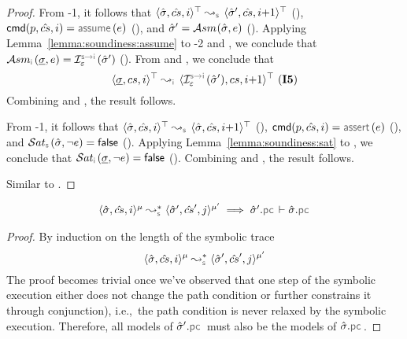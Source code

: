 \begin{proof}
\noindent {}
From \hyp{1}, it follows that $\abssemrule{\sstate, \scs, i}{\sstate', \scs, i{+}1}{\top}{\top}{\symbolic}$ (), 
$\ccmd[\prog][\scs]{i}  = \assume(\jsilexpr)$ (), and $\hat{\sigma}' = \mathcal{A}{sm}_{}(\hat{\sigma}, e)$ (). 
Applying Lemma~\ref{lemma:soundiness:assume} to 
\hyp{2} and , we conclude that 
$\absassume{\instrumented}(\istate, \jsilexpr) = \interpret{\symbinst}{\senv}(\sstate')$ (). 
From  and , we conclude that 
 $$\abssemrule{\istate, \cs, i}{\interpret{\symbinst}{\senv}(\sstate'), \cs, i{+}1}{\top}{\top}{\instrumented} \text{ (\ieq{5})}$$
 Combining   and , the result follows.
 \vspace{5pt}

\noindent {}
From \hyp{1}, it follows that $\abssemrule{\sstate, \scs, i}{\sstate, \scs, i{+}1}{\top}{\top}{\symbolic}$ (), 
$ \ccmd[\prog][\scs]{i}  = \jassert(\jsilexpr)$ (), and {$\abssat{\symbolic}(\sstate, \neg \jsilexpr) = \jfalse$} (). 
Applying Lemma~\ref{lemma:soundiness:sat} to , we conclude that 
$\abssat{\instrumented}(\istate, \neg \jsilexpr) = \jfalse$ (). 
Combining  and , the result follows. 
 \vspace{5pt}
 
\noindent {}
Similar to . 
 \vspace{5pt} 
\end{proof}


\begin{lemma}\label{lemma:pc:monotonocity}
$$
\begin{array}{l}
\transabssemrule{\sstate, \scs, i}{\sstate', \scs', j}{\mode}{\mode'}{\symbolic} 
    \implies \sstate'.\pcsel \vdash \sstate.\pcsel
\end{array}
$$
\end{lemma}
\begin{proof}
By induction on the length of the symbolic trace 
$$\transabssemrule{\sstate, \scs, i}{\sstate', \scs', j}{\mode}{\mode'}{\symbolic}$$
The proof becomes trivial once we've observed that one step of the symbolic execution either does not change the path condition or further constrains it through conjunction), i.e.,~the path condition is never relaxed by the symbolic execution. Therefore, all models of $\sstate'.\pcsel$ must also be the models of $\sstate.\pcsel$.
\end{proof}


